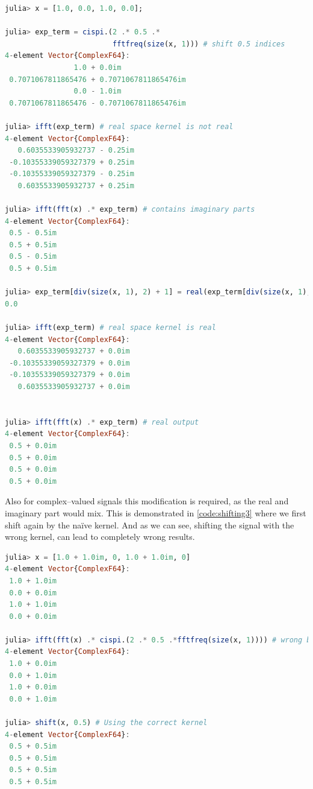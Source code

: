 \documentclass{juliacon}
\begin{document}
\begin{lstlisting}[language=Julia, label={code:shifting2}, caption={Fixing the Nyquist amplitude of the shifting exponential phase ramp.}, captionpos=b] 
julia> x = [1.0, 0.0, 1.0, 0.0];

julia> exp_term = cispi.(2 .* 0.5 .* 
                         fftfreq(size(x, 1))) # shift 0.5 indices
4-element Vector{ComplexF64}:
                1.0 + 0.0im
 0.7071067811865476 + 0.7071067811865476im
                0.0 - 1.0im
 0.7071067811865476 - 0.7071067811865476im
 
julia> ifft(exp_term) # real space kernel is not real
4-element Vector{ComplexF64}:
   0.6035533905932737 - 0.25im
 -0.10355339059327379 + 0.25im
 -0.10355339059327379 - 0.25im
   0.6035533905932737 + 0.25im 
 
julia> ifft(fft(x) .* exp_term) # contains imaginary parts
4-element Vector{ComplexF64}:
 0.5 - 0.5im
 0.5 + 0.5im
 0.5 - 0.5im
 0.5 + 0.5im

julia> exp_term[div(size(x, 1), 2) + 1] = real(exp_term[div(size(x, 1), 2) + 1])
0.0

julia> ifft(exp_term) # real space kernel is real
4-element Vector{ComplexF64}:
   0.6035533905932737 + 0.0im
 -0.10355339059327379 + 0.0im
 -0.10355339059327379 + 0.0im
   0.6035533905932737 + 0.0im


julia> ifft(fft(x) .* exp_term) # real output
4-element Vector{ComplexF64}:
 0.5 + 0.0im
 0.5 + 0.0im
 0.5 + 0.0im
 0.5 + 0.0im
\end{lstlisting}        

Also for complex--valued signals this modification is required, as the real and imaginary part would mix. 
This is demonstrated in \autoref{code:shifting3} where we first shift again
by the na\"ive kernel. And as we can see, shifting the signal with the wrong kernel, can lead to completely wrong results.
\begin{lstlisting}[language=Julia, label={code:shifting3}, caption={Handling of Nyquist frequency is also for complex signals important.}, captionpos=b] 
julia> x = [1.0 + 1.0im, 0, 1.0 + 1.0im, 0]
4-element Vector{ComplexF64}:
 1.0 + 1.0im
 0.0 + 0.0im
 1.0 + 1.0im
 0.0 + 0.0im

julia> ifft(fft(x) .* cispi.(2 .* 0.5 .*fftfreq(size(x, 1)))) # wrong because of Nyquist amplitude
4-element Vector{ComplexF64}:
 1.0 + 0.0im
 0.0 + 1.0im
 1.0 + 0.0im
 0.0 + 1.0im

julia> shift(x, 0.5) # Using the correct kernel
4-element Vector{ComplexF64}:
 0.5 + 0.5im
 0.5 + 0.5im
 0.5 + 0.5im
 0.5 + 0.5im
\end{lstlisting}        
\end{document}
